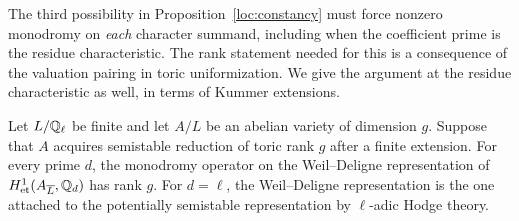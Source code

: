 The third possibility in Proposition~\ref{loc:constancy} must force
nonzero monodromy on \emph{each} character summand, including when the
coefficient prime is the residue characteristic.  The rank statement
needed for this is a consequence of the valuation pairing in toric
uniformization.  We give the argument at the residue characteristic as
well, in terms of Kummer extensions.

\begin{lemma}\label{loc:toric-monodromy}
Let $L/\mathbb Q_\ell$ be finite and let $A/L$ be an abelian variety of
dimension $g$.  Suppose that $A$ acquires semistable
reduction of toric rank $g$ after a finite extension.  For every prime
$d$, the monodromy operator on the Weil--Deligne representation of
$H^1_{\mathrm{et}}(A_{\overline L},\mathbb Q_d)$ has rank $g$.
For $d=\ell$, the Weil--Deligne representation is the one attached to
the potentially semistable representation by $\ell$-adic Hodge theory.
\end{lemma}

